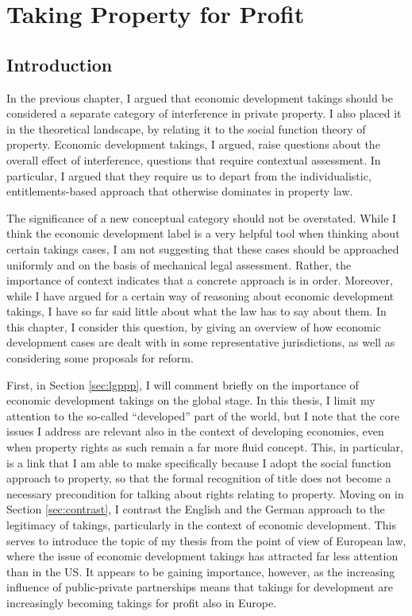 
\chapter{Taking Property for Profit}\label{chap:2}

\section{Introduction}\label{sec:intro}

In the previous chapter, I argued that economic development takings should be considered a separate category of interference in private property. I also placed it in the theoretical landscape, by relating it to the social function theory of property. Economic development takings, I argued, raise questions about the overall effect of interference, questions that require contextual assessment. In particular, I argued that they require us to depart from the individualistic, entitlements-based approach that otherwise dominates in property law.

The significance of a new conceptual category should not be overstated. While I think the economic development label is a very helpful tool when thinking about certain takings cases, I am not suggesting that these cases should be approached uniformly and on the basis of mechanical legal assessment. Rather, the importance of context indicates that a concrete approach is in order. Moreover, while I have argued for a certain way of reasoning about economic development takings, I have so far said little about what the law has to say about them. In this chapter, I consider this question, by giving an overview of how economic development cases are dealt with in some representative jurisdictions, as well as considering some proposals for reform.

First, in Section \ref{sec:lgppp}, I will comment briefly on the importance of economic development takings on the global stage. In this thesis, I limit my attention to the so-called ``developed'' part of the world, but I note that the core issues I address are relevant also in the context of developing economies, even when property rights as such remain a far more fluid concept. This, in particular, is a link that I am able to make specifically because I adopt the social function approach to property, so that the formal recognition of title does not become a necessary precondition for talking about rights relating to property. Moving on in Section \ref{sec:contrast}, I contrast the English and the German approach to the legitimacy of takings, particularly in the context of economic development. This serves to introduce the topic of my thesis from the point of view of European law, where the issue of economic development takings has attracted far less attention than in the US. It appears to be gaining importance, however, as the increasing influence of public-private partnerships means that takings for development are increasingly becoming takings for profit also in Europe.

